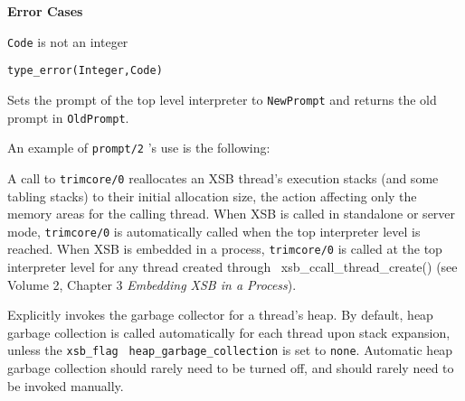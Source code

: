 \begin{description}
{\bf Error Cases}
\bi
\item 	{\tt Code} is not an integer
\bi
\item 	{\tt type\_error(Integer,Code)}
\ei
\ei

    Sets the prompt of the top level interpreter to {\tt NewPrompt} and 
    returns the old prompt in {\tt OldPrompt}.

    An example of {\tt prompt/2} 's use is the following:


%
A call to {\tt trimcore/0} reallocates an XSB thread's execution
stacks (and some tabling stacks) to their initial allocation size, the
action affecting only the memory areas for the calling thread.  When
XSB is called in standalone or server mode, {\tt trimcore/0} is
automatically called when the top interpreter level is reached.  When
XSB is embedded in a process, {\tt trimcore/0} is called at the top
interpreter level for any thread created through
{\ xsb\_ccall\_thread\_create()} (see Volume 2, Chapter 3 {\em
  Embedding XSB in a Process}).

%
Explicitly invokes the garbage collector for a thread's heap. By
default, heap garbage collection is called automatically for each
thread upon stack expansion, unless the {\tt xsb\_flag} {\tt
  heap\_garbage\_collection} is set to {\tt none}.  Automatic heap
garbage collection should rarely need to be turned off, and should
rarely need to be invoked manually.



\end{description}
